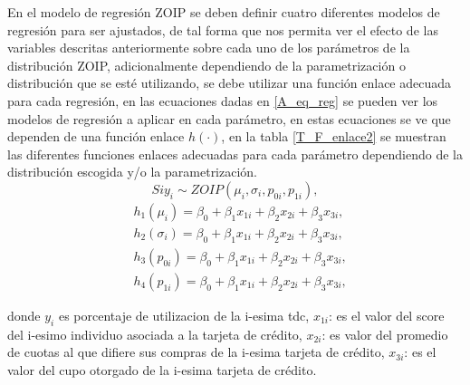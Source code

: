 En el modelo de regresi\'{o}n ZOIP se deben definir cuatro diferentes modelos de regresi\'{o}n para ser ajustados, de tal forma que nos permita ver el efecto de las variables descritas anteriormente sobre cada uno de los par\'{a}metros de la distribuci\'{o}n ZOIP, adicionalmente dependiendo de la parametrizaci\'{o}n o distribuci\'{o}n que se est\'{e} utilizando, se debe utilizar una funci\'{o}n enlace adecuada para cada regresi\'{o}n, en las ecuaciones dadas en \eqref{A_eq_reg} se pueden ver los modelos de regresi\'{o}n a aplicar en cada par\'{a}metro, en estas ecuaciones se ve que dependen de una funci\'{o}n enlace $h(\cdot)$, en la tabla \ref{T_F_enlace2} se muestran las diferentes funciones enlaces adecuadas para cada par\'{a}metro dependiendo de la distribuci\'{o}n escogida y/o la parametrizaci\'{o}n.
\[
Si y_{i} \sim ZOIP(\mu_{i},\sigma_{i},p_{0i}, p_{1i}),
\]
\begin{equation}
\begin{split}
&h_1(\mu_{i})=\beta_0+\beta_1 x_{1i}+\beta_2 x_{2i}+\beta_3 x_{3i},\\
&h_2(\sigma_{i})=\beta_0+\beta_1 x_{1i}+\beta_2 x_{2i}+\beta_3 x_{3i},\\
&h_3(p_{0i})=\beta_0+\beta_1 x_{1i}+\beta_2 x_{2i}+\beta_3 x_{3i},\\
&h_4(p_{1i}) =\beta_0+\beta_1 x_{1i}+\beta_2 x_{2i}+\beta_3 x_{3i},
\end{split}
\label{A_eq_reg}
\end{equation}

donde $y_i$ es porcentaje de utilizacion de la i-esima tdc, $x_{1i}$: es el valor del score del i-esimo individuo asociada a la tarjeta de cr\'{e}dito, $x_{2i}$: es valor del promedio de cuotas al que difiere sus compras de la i-esima tarjeta de cr\'{e}dito, $x_{3i}$: es el valor del cupo otorgado de la i-esima tarjeta de cr\'{e}dito. 

